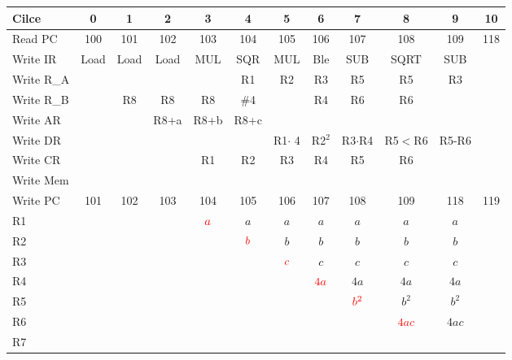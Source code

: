 \documentclass[border=2]{standalone}
\newcommand{\red}[1]{{\color{red}#1}}
\begin{document}
\begin{tabular}
{|l		| c	| c	| c	| c		| c		| c		| c		| c		| c		| c		| c	|}\hline
Cilce		& 0	& 1	& 2	& 3		& 4		& 5		& 6		& 7		& 8		& 9		& 10	\\\hline\hline

Read PC		& 100	& 101	& 102	& 103		& 104		& 105		& 106		& 107		& 108		& 109		& 118	\\
Write IR	& Load	& Load	& Load	& MUL		& SQR		& MUL 		& Ble		& SUB		& SQRT		& SUB		&	\\\hline

Write R\_A	&	&	&	&		& R1		& R2		& R3		& R5 		& R5		& R3		&	\\
Write R\_B	&	& R8	& R8	& R8		& \#4		&		& R4		& R6		& R6		&		&	\\\hline

Write AR	&	&	& R8+a	& R8+b		& R8+c		&		&		&		&		&		&	\\
Write DR	&	&	&	&		&		& R1$\cdot$ 4	& R2$^2$	& R3$\cdot$R4	& R5$<$R6	& R5-R6		&	\\\hline

Write CR	&	&	&	& R1		& R2		& R3		& R4		& R5		& R6		&		&	\\
Write Mem	&	&	&	&		&		&		&		&		&		&		&	\\
Write PC	& 101	& 102	& 103	& 104		& 105		& 106		& 107		& 108		& 109		& 118		& 119	\\\hline\hline

R1		&	&	&	& $\red{a}$	& $a$		& $a$		& $a$		& $a$		& $a$		& $a$		&	\\
R2		&	&	&	&		& $\red{b}$	& $b$		& $b$		& $b$		& $b$		& $b$		&	\\
R3		&	&	&	&		&		& $\red{c}$	& $c$		& $c$		& $c$		& $c$		&	\\
R4		&	&	&	&		&		&		& $\red{4a}$	& $4a$		& $4a$		& $4a$		&	\\
R5		&	&	&	&		&		&		&		& $\red{b^2}$	& $b^2$		& $b^2$		&	\\
R6		&	&	&	&		&		&		&		&		& $\red{4ac}$	& $4ac$		&	\\
R7		&	&	&	&		&		&		&		&		&		&		&	\\\hline

\end{tabular}
\end{document}
